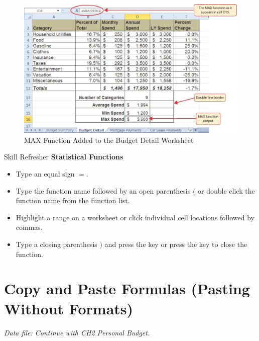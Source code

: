 \begin{figure}[H]
	\centering
	\includegraphics[width=\maxwidth{.95\linewidth}]{gfx/ch02_fig25}
	\caption{MAX Function Added to the Budget Detail Worksheet}
	\label{02:fig25}
\end{figure}

\begin{center}
	\begin{sklbox}{Skill Refresher}
		\textbf{Statistical Functions}
		\\
		\begin{itemize}
			\setlength{\itemsep}{0pt}
			\setlength{\parskip}{0pt}
			\setlength{\parsep}{0pt}

			\item Type an equal sign $ = $.
			\item Type the function name followed by an open parenthesis $ ( $ or double click the function name from the function list.
			\item Highlight a range on a worksheet or click individual cell locations followed by commas.
			\item Type a closing parenthesis $ ) $ and press the  key or press the  key to close the function.
			
		\end{itemize}
	\end{sklbox}
\end{center}

\section{Copy and Paste Formulas (Pasting Without Formats)}

\textit{Data file: Continue with CH2 Personal Budget.}

